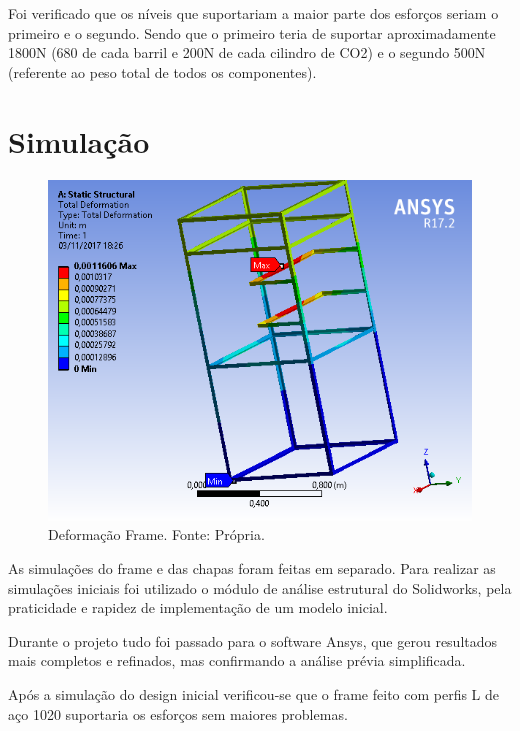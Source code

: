   Foi verificado que os níveis que suportariam a maior parte dos esforços seriam o primeiro e o segundo. 
  Sendo que o primeiro teria de suportar aproximadamente 1800N (680 de cada barril e 200N de cada 
  cilindro de CO2) e o segundo 500N (referente ao peso total de todos os componentes).
  
  \section[Simulação]{Simulação}

  \begin{figure}[H]
    \centering
    \includegraphics[scale= 0.8]{figuras/estrutura/deformacao-frame.png}
    \caption{Deformação Frame. Fonte: Própria.}
    \label{modelagem}
  \end{figure}

  As simulações do frame e das chapas foram feitas em separado. Para realizar as simulações
  iniciais foi utilizado o módulo de análise estrutural do Solidworks, pela praticidade e 
  rapidez de implementação de um modelo inicial. 

  Durante o projeto tudo foi passado para o software Ansys, que gerou resultados mais completos 
  e refinados, mas confirmando a análise prévia simplificada.

  Após a simulação do design inicial verificou-se que o frame feito com perfis L de aço 1020 
  suportaria os esforços sem maiores problemas.
  
